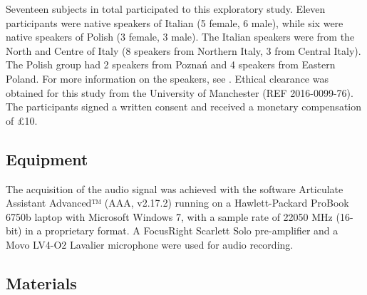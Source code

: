 \documentclass[preprint]{JASAnew}
\begin{document}
Seventeen subjects in total participated to this exploratory study.
Eleven participants were native speakers of Italian (5 female, 6 male),
while six were native speakers of Polish (3 female, 3 male). The Italian
speakers were from the North and Centre of Italy (8 speakers from
Northern Italy, 3 from Central Italy). The Polish group had 2 speakers
from Poznań and 4 speakers from Eastern Poland. For more information on
the speakers, see . Ethical clearance was obtained for
this study from the University of Manchester (REF 2016-0099-76). The
participants signed a written consent and received a monetary
compensation of £10.

\hypertarget{equipment}{%
\subsection{Equipment}\label{equipment}}

The acquisition of the audio signal was achieved with the software
Articulate Assistant Advanced™ (AAA, v2.17.2) running on a
Hawlett-Packard ProBook 6750b laptop with Microsoft Windows 7, with a
sample rate of 22050 MHz (16-bit) in a proprietary format. A FocusRight
Scarlett Solo pre-amplifier and a Movo LV4-O2 Lavalier microphone were
used for audio recording.

\hypertarget{materials}{%
\subsection{Materials}\label{materials}}

\label{s:materials}
\end{document}
